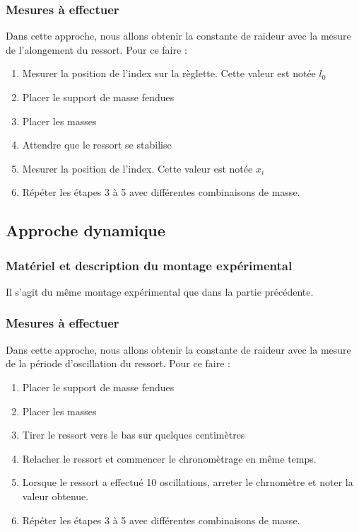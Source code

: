 \documentclass[a4paper,10pt,french]{scrartcl}
\begin{document}
\subsubsection{Mesures à effectuer}
Dans cette approche, nous allons obtenir la constante de raideur avec la mesure de l'alongement du ressort. Pour ce faire :
\begin{enumerate}
 \item Mesurer la position de l'index sur la règlette. Cette valeur est notée \(l_0\)
 \item Placer le support de masse fendues
 \item Placer les masses
 \item Attendre que le ressort se stabilise
 \item Mesurer la position de l'index. Cette valeur est notée \(x_i\)
 \item Répéter les étapes 3 à 5 avec différentes combinaisons de masse.
\end{enumerate}

\subsection{Approche dynamique}
\subsubsection{Matériel et description du montage expérimental}
Il s'agit du m\^eme montage expérimental que dans la partie précédente.
\subsubsection{Mesures à effectuer}
Dans cette approche, nous allons obtenir la constante de raideur avec la mesure de la période d'oscillation du ressort. Pour ce faire :
\begin{enumerate}
 \item Placer le support de masse fendues
 \item Placer les masses
 \item Tirer le ressort vers le bas sur quelques centimètres
 \item Relacher le ressort et commencer le chronomètrage en m\^eme temps.
 \item Lorsque le ressort a effectué 10 oscillations, arreter le chrnomètre et noter la valeur obtenue.
 \item Répéter les étapes 3 à 5 avec différentes combinaisons de masse.
\end{enumerate}
\end{document}
